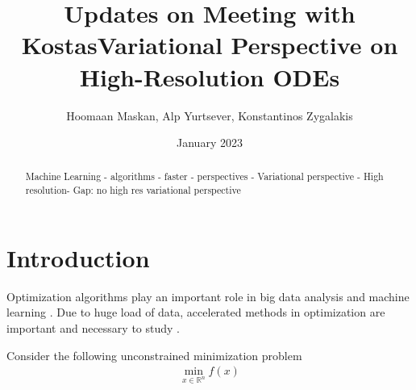 \documentclass{article}
\title{Updates on Meeting with Kostas}
\author{%
}
\title{Variational Perspective on High-Resolution ODEs}
\author{Hoomaan Maskan, Alp Yurtsever, Konstantinos Zygalakis}
\date{January 2023}
\theoremstyle{plain}
\theoremstyle{definition}
\theoremstyle{remark}
\begin{document}
\maketitle
\begin{abstract}
    Machine Learning - algorithms - faster - perspectives - Variational perspective - High resolution- Gap: no high res variational perspective
\end{abstract}
\section{Introduction}\label{sec_introduction}
Optimization algorithms play an important role in big data analysis \cite{li2020accelerated} and machine learning \cite{OPT-036,wilson2021lyapunov,WibisonoE7351}. Due to huge load of data, accelerated methods in optimization are important and necessary to study \cite{Shi2021UnderstandingTA,JMLR:v17:15-084,wilson2021lyapunov,Lessard2016AnalysisAD}. \par
Consider the following unconstrained minimization problem
\begin{align}\label{problem}
    \min_{x\in \mathbb{R}^n} f(x)
\end{align}
\end{document}

